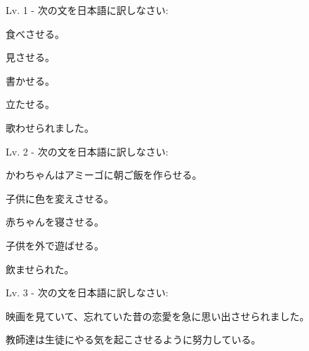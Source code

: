 
\author{Kristijan Čavić}

	
	\begin{mondai}{Lv. 1 - 次の文を日本語に訳しなさい: }
		\item 食べさせる。
		\item 見させる。
		\item 書かせる。
		\item 立たせる。
		\item 歌わせられました。
	\end{mondai}
	
	\begin{mondai}{Lv. 2 - 次の文を日本語に訳しなさい: }
		\item かわちゃんはアミーゴに朝ご飯を作らせる。
		\item 子供に色を変えさせる。
		\item 赤ちゃんを寝させる。
		\item 子供を外で遊ばせる。
		\item 飲ませられた。
	\end{mondai}
	
	\begin{mondai}{Lv. 3 - 次の文を日本語に訳しなさい: }
		\item 映画を見ていて、忘れていた昔の恋愛を急に思い出させられました。
		\item 教師達は生徒にやる気を起こさせるように努力している。
	\end{mondai}
